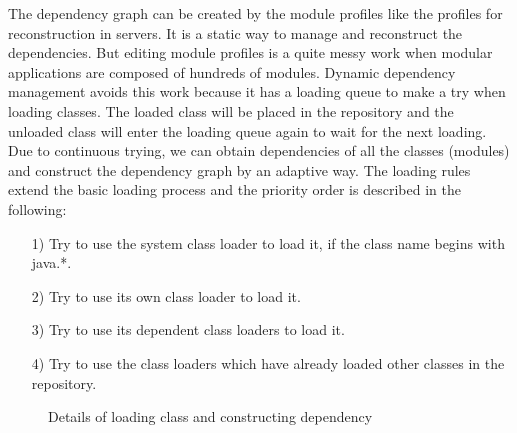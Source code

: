 \documentclass[conference]{IEEEtran}
\begin{document}
The dependency graph can be created by the module profiles like the profiles for reconstruction in servers.
It is a static way to manage and reconstruct the dependencies.
But editing module profiles is a quite messy work when modular applications are composed of hundreds of modules.
Dynamic dependency management avoids this work because it has a loading queue to make a try when loading classes.
The loaded class will be placed in the repository and the unloaded class will enter the loading queue again to wait for the next loading.
Due to continuous trying, we can obtain dependencies of all the classes (modules) and construct the dependency graph by an adaptive way.
The loading rules extend the basic loading process and the priority order is described in the following: 
\begin{itemize}[]
\item[1)] Try to use the system class loader to load it, if the class name begins with java.*.
\item[2)] Try to use its own class loader to load it.
\item[3)] Try to use its dependent class loaders to load it.
\item[4)] Try to use the class loaders which have already loaded other classes in the repository. 
\end{itemize}

\begin{figure}[ht]
\centering
{}
\hfil
{}
\hfil
{}
\caption{Details of loading class and constructing dependency}
\label{fig:loading_queue}
\end{figure}
\end{document}
